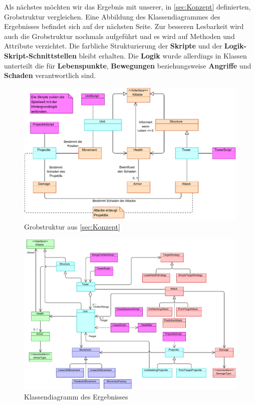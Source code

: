 Als nächstes möchten wir das Ergebnis mit unserer, in \autoref{sec:Konzept} definierten, Grobstruktur vergleichen. Eine Abbildung des Klassendiagrammes des Ergebnisses befindet sich auf der nächsten Seite. Zur besseren Lesbarkeit wird auch die Grobstruktur nochmals aufgeführt und es wird auf Methoden und Attribute verzichtet. Die farbliche Strukturierung der \textbf{\textcolor{ScriptClass}{Skripte}} und der \textbf{\textcolor{ScriptLogicInterface}{Logik-Skript-Schnittstellen}} bleibt erhalten. Die \textbf{\textcolor{LogicClass}{Logik}} wurde allerdings in Klassen unterteilt die für \textbf{\textcolor{HealthClass}{Lebenspunkte}}, \textbf{\textcolor{MovementClass}{Bewegungen}} beziehungsweise \textbf{\textcolor{AttackClass}{Angriffe}} und \textbf{\textcolor{AttackClass}{Schaden}} verantwortlich sind.\\

\begin{figure}[h]
\centering
\includegraphics[width=1\textwidth]{./images/Kapitel_Ergebnis_und_Ausblick/Grobstruktur}
\caption{Grobstruktur aus \autoref{sec:Konzept} }
\label{fig:Grobstruktur_Ergebnis}
\end{figure}
	
\begin{figure}[h]
\centering
\includegraphics[width=1\textwidth]{./images/Kapitel_Ergebnis_und_Ausblick/Overview}
\caption{Klassendiagramm des Ergebnisses}
\label{fig:Overview}
\end{figure}
\clearpage

